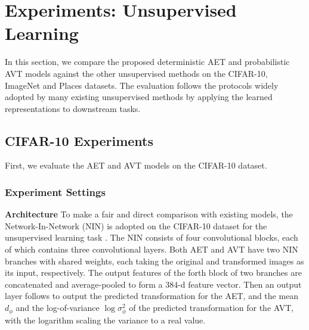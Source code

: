 \documentclass[10pt,journal,compsoc,twoside]{IEEEtran}
\begin{document}
%


\section{Experiments: Unsupervised Learning}\label{sec:unexp}
In this section, we compare the proposed deterministic AET and probabilistic AVT models against the other unsupervised methods on the CIFAR-10, ImageNet and Places datasets.  The evaluation follows the protocols widely adopted by many existing unsupervised methods by applying the learned representations to downstream tasks.

\subsection{CIFAR-10 Experiments}
First, we evaluate the AET and AVT models on the CIFAR-10 dataset.

\subsubsection{Experiment Settings}



\vspace{2mm}
{\noindent \bf Architecture} To make a fair and direct comparison with existing models, the Network-In-Network (NIN) is adopted on the CIFAR-10 dataset for the unsupervised learning task \cite{gidaris2018unsupervised,zhang2019aet}.  %
The NIN consists of four convolutional blocks, each of which contains three convolutional layers.
Both AET and AVT have two NIN branches with shared weights, each taking the original and transformed images as its input, respectively. The output features of the forth block of two branches are concatenated and average-pooled to form a $384$-d feature vector. Then an output layer follows to output the predicted transformation for the AET, and the mean $d_\phi$ and the log-of-variance $\log \sigma_\phi^2$ of the predicted transformation for the AVT, with the logarithm scaling the variance to a real value.
\end{document}
